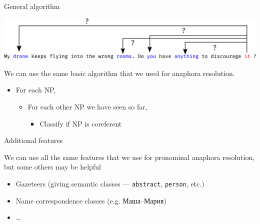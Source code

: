 \documentclass[dvipsnames, 10pt, compress]{beamer}
\begin{document}
\begin{frame}{General algorithm}

\includegraphics[width=\textwidth]{graphics/classifier-coref-2.eps}

We can use the same basic algorithm that we used for anaphora resolution.

\begin{itemize}
  \item For each NP,
  \begin{itemize}
     \item For each other NP we have seen so far,
     \begin{itemize}
       \item Classify if NP is coreferent
     \end{itemize}
  \end{itemize}
\end{itemize}

\end{frame}


\begin{frame}{Additional features}

We can use all the same features that we use for pronominal anaphora resolution, 
but some others may be helpful

\begin{itemize}
  \item Gazeteers (giving semantic classes --- {\tt abstract}, {\tt person}, etc.)
  \item Name correspondence classes (e.g. Маша--Мария)
  \item \ldots
\end{itemize}


\end{frame}
\end{document}
